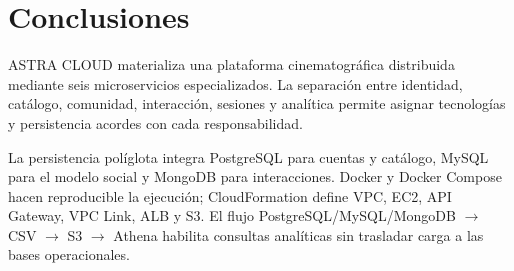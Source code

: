\chapter{Conclusiones}
ASTRA CLOUD materializa una plataforma cinematográfica distribuida mediante seis microservicios especializados. La separación entre identidad, catálogo, comunidad, interacción, sesiones y analítica permite asignar tecnologías y persistencia acordes con cada responsabilidad.

La persistencia políglota integra PostgreSQL para cuentas y catálogo, MySQL para el modelo social y MongoDB para interacciones. Docker y Docker Compose hacen reproducible la ejecución; CloudFormation define VPC, EC2, API Gateway, VPC Link, ALB y S3. El flujo PostgreSQL/MySQL/MongoDB $\rightarrow$ CSV $\rightarrow$ S3 $\rightarrow$ Athena habilita consultas analíticas sin trasladar carga a las bases operacionales.

